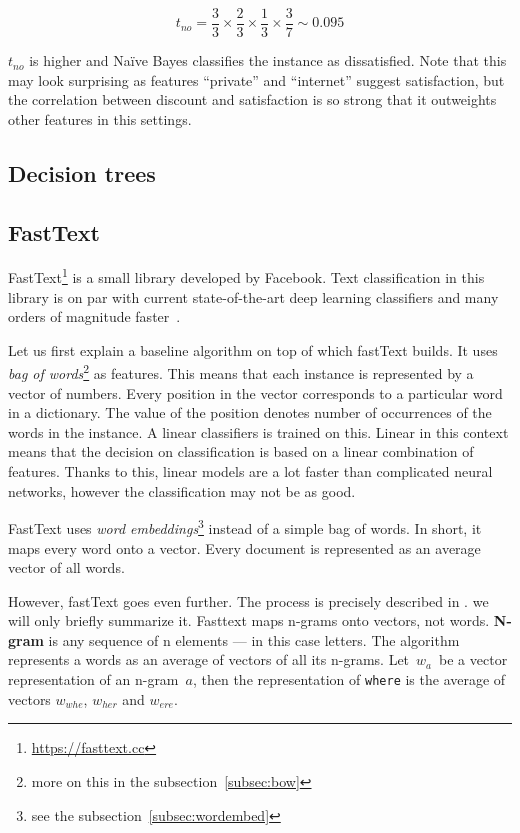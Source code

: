 \begin{equation}
	t_{no} = 
	\frac{3}{3} \times
	\frac{2}{3} \times
	\frac{1}{3} \times
	\frac{3}{7}
	\sim 0.095
\end{equation}

$t_{no}$ is higher and Na\"{i}ve Bayes classifies the instance as dissatisfied.
Note that this may look surprising as features ``private'' and ``internet'' suggest satisfaction,
but the correlation between discount and satisfaction is so strong that it outweights other features in this settings.




\subsection{Decision trees}
\label{subsec:decisiontree}

\subsection{FastText}

FastText\footnote{\url{https://fasttext.cc}} is a small library developed by Facebook.
Text classification in this library is on par with current state-of-the-art deep learning classifiers
and many orders of magnitude faster~\citep{Joulin2017bag}.

Let us first explain a baseline algorithm on top of which fastText builds.
It uses {\it bag of words}\footnote{more on this in the subsection~\ref{subsec:bow}} as features.
This means that each instance is represented by a vector of numbers.
Every position in the vector corresponds to a particular word in a dictionary.
The value of the position denotes number of occurrences of the words in the instance.
A linear classifiers is trained on this.
Linear in this context means that the decision on classification is based on a linear combination of features.
Thanks to this, linear models are a lot faster than complicated neural networks, however the classification may not be as good.

FastText uses {\it word embeddings}\footnote{see the subsection~\ref{subsec:wordembed}} instead of a simple bag of words.
In short, it maps every word onto a vector. Every document is represented as an average vector of all words.

However, fastText goes even further.
The process is precisely described in \citet{Bojanowski2017enriching}.
we will only briefly summarize it.
Fasttext maps n-grams onto vectors, not words.
{\bf N-gram} is any sequence of n elements --- in this case letters.
The algorithm represents a words as an average of vectors of all its n-grams.
Let~$w_{a}$~be a vector representation of an n-gram~$a$, then 
the representation of \texttt{where} is the average of vectors
$w_{whe}$, 
$w_{her}$ and
$w_{ere}$.

